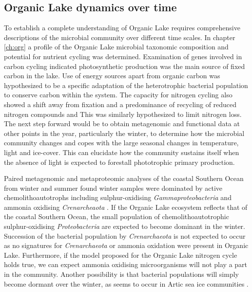 \subsection{Organic Lake dynamics over time}
To establish a complete understanding of Organic Lake requires comprehensive descriptions of the microbial community over different time scales.
In chapter \ref{ch:org} a profile of the Organic Lake microbial taxonomic composition and potential for nutrient cycling was determined.
Examination of genes involved in carbon cycling indicated photosynthetic production was the main source of fixed carbon in the lake.
Use of energy sources apart from organic carbon was hypothesized to be a specific adaptation of the heterotrophic bacterial population to conserve carbon within the system.
The capacity for nitrogen cycling also showed a shift away from fixation and a predominance of recycling of reduced nitrogen compounds and This was similarly hypothesized to limit nitrogen loss.
The next step forward would be to obtain metagenomic and functional data at other points in the year, particularly the winter, to determine how the microbial community changes and copes with the large seasonal changes in temperature, light and ice-cover.
This can elucidate how the community sustains itself when the absence of light is expected to forestall phototrophic primary production.

Paired metagenomic and metaproteomic analyses of the coastal Southern Ocean from winter and summer found winter samples were dominated by active chemolithoautotrophs including sulphur-oxidising \emph{Gammaproteobacteria} and ammonia oxidising \emph{Crenarcheaota} \cite{Grzymski2012, Williams2012b}.
If the Organic Lake ecosystem reflects that of the coastal Southern Ocean, the small population of chemolithoautotrophic sulphur-oxidising \emph{Proteobacteria} are expected to become dominant in the winter.
Succession of the bacterial population by \emph{Crenarchaeota} is not expected to occur as no signatures for \emph{Crenarchaeota} or ammonia oxidation were present in Organic Lake.
Furthermore, if the model proposed for the Organic Lake nitrogen cycle holds true, we can expect ammonia oxidising microorganisms will not play a part in the community.
Another possibility is that bacterial populations will simply become dormant over the winter, as seems to occur in Artic sea ice communities \cite{Collins2010}.


